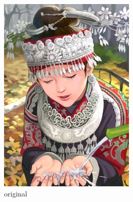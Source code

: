 \begin{figure}[t]
    \centering
    \begin{subfigure}{.24\linewidth}
        \includegraphics[width=\linewidth]{images/comic_HR.jpg}
        \caption{original}
        \label{fig:srgan_orig}
    \end{subfigure}
    \begin{subfigure}{.24\linewidth}

\end{subfigure}
\end{figure}
